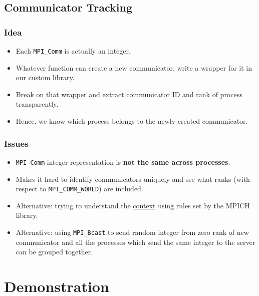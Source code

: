 \documentclass{beamer}
\begin{document}
\subsection{Communicator Tracking}
\begin{frame}
  \frametitle{Idea}
  \begin{itemize}
  \item <1-> Each \texttt{MPI\_Comm} is actually an integer.
  \item <2-> Whatever function can create a new communicator, write a wrapper for it in our custom library.
  \item <3-> Break on that wrapper and extract communicator ID and rank of process transparently.
  \item <4-> Hence, we know which process belongs to the newly created communicator.
 \end{itemize}
\end{frame}

\begin{frame}
  \frametitle{Issues}
  \begin{itemize}
  \item <1-> \texttt{MPI\_Comm} integer representation is \textbf{not the same across processes}.
  \item <2-> Makes it hard to identify communicators uniquely and see what ranks (with respect to \texttt{MPI\_COMM\_WORLD}) are included.
  \item <3-> Alternative: trying to understand the \href{https://wiki.mpich.org/mpich/index.php/Communicators_and_Context_IDs}{context} using rules set by the MPICH library.
  \item <4-> Alternative: using \texttt{MPI\_Bcast} to send random integer from zero rank of new communicator and all the processes which send the same integer to the server can be grouped together.
 \end{itemize}
\end{frame}


\section{Demonstration}
\end{document}
